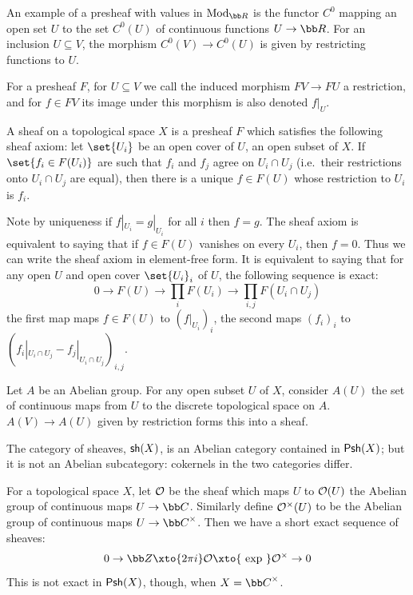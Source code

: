 An example of a presheaf with values in $\Mod_\bR$ is the functor $C^0$ mapping an open set $U$ to the set $C^0(U)$ of continuous functions $U\to\bR$.
For an inclusion $U\subseteq V$, the morphism $C^0(V)\to C^0(U)$ is given by restricting functions to $U$.

For a presheaf $F$, for $U\subseteq V$ we call the induced morphism $FV\to FU$ a {\emphcolor restriction}, and for $f\in FV$ its image under this morphism is also denoted $f|_U$.

\bdefn

    A {\emphcolor sheaf} on a topological space $X$ is a presheaf $F$ which satisfies the following {\emphcolor sheaf axiom}:
    let $\set{U_i}$ be an open cover of $U$, an open subset of $X$.
    If $\set{f_i\in F(U_i)}$ are such that $f_i$ and $f_j$ agree on $U_i\cap U_j$ (i.e.\ their restrictions onto $U_i\cap U_j$ are equal), then there is a unique $f\in F(U)$ whose restriction to
    $U_i$ is $f_i$.

\edefn

Note by uniqueness if $f|_{U_i}=g|_{U_i}$ for all $i$ then $f=g$.
The sheaf axiom is equivalent to saying that if $f\in F(U)$ vanishes on every $U_i$, then $f=0$.
Thus we can write the sheaf axiom in element-free form.
It is equivalent to saying that for any open $U$ and open cover $\set{U_i}_i$ of $U$, the following sequence is exact:
$$ 0 \to F(U) \to \prod_i F(U_i) \to \prod_{i,j}F(U_i\cap U_j) $$
the first map maps $f\in F(U)$ to $(f|_{U_i})_i$, the second maps $(f_i)_i$ to $(f_i|_{U_i\cap U_j}-f_j|_{U_i\cap U_j})_{i,j}$.

\bexam

    Let $A$ be an Abelian group.
    For any open subset $U$ of $X$, consider $A(U)$ the set of continuous maps from $U$ to the discrete topological space on $A$.
    $A(V)\to A(U)$ given by restriction forms this into a sheaf.

\eexam

The category of sheaves, ${\sf sh}(X)$, is an Abelian category contained in ${\sf Psh}(X)$; but it is not an Abelian subcategory: cokernels in the two categories differ.

For a topological space $X$, let ${{\cal O}}$ be the sheaf which maps $U$ to ${{\cal O}}(U)$ the Abelian group of continuous maps $U\to\bC$.
Similarly define ${{\cal O}}^\times(U)$ to be the Abelian group of continuous maps $U\to\bC^\times$.
Then we have a short exact sequence of sheaves:
$$ 0 \to \bZ \xto{2\pi i} \O \xto{\ \exp\ } \O^\times \to 0 $$
This is not exact in ${\sf Psh}(X)$, though, when $X=\bC^\times$.


